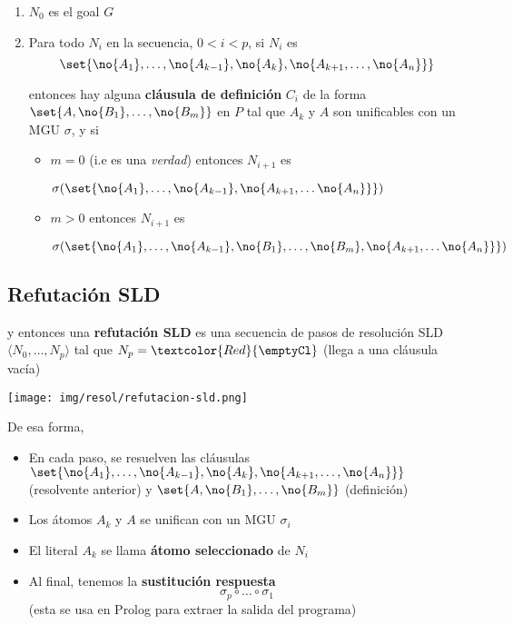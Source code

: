 \documentclass{report}
\theoremstyle{definition} %
\newcommand{\changed}[1]{\textcolor{Red}{#1}}
\begin{document}
\begin{enumerate}
    \item $N_0$ es el goal $G$
    \item Para todo $N_i$ en la secuencia, $0 < i < p$, si $N_i$ es
    \[
        \set{
            \no{A_1}, \dots, \no{A_{k-1}}, \no{A_k},
            \no{A_{k+1}, \dots, \no{A_n}}
        }
    \]

    entonces hay alguna \textbf{cláusula de definición} $C_i$ de la forma
    $\set{A, \no{B_1}, \dots, \no{B_m}}$ en $P$ tal que $A_k$ y $A$ son
    unificables con un MGU $\sigma$, y si
    \begin{itemize}
        \item $m = 0$ (i.e es una \textit{verdad}) entonces $N_{i+1}$ es
        
        \(
            \sigma(\set{
                \no{A_1}, \dots, \no{A_{k-1}},
                \no{A_{k+1}, \dots \no{A_n}}
            })
        \)
        \item $m > 0$ entonces $N_{i+1}$ es
        
        \(
            \sigma(\set{
                \no{A_1}, \dots, \no{A_{k-1}},
                \no{B_1}, \dots, \no{B_m},
                \no{A_{k+1}, \dots \no{A_n}}
            })
        \)
    \end{itemize}
\end{enumerate}

\subsection{Refutación SLD}

y entonces una \textbf{refutación SLD} es una secuencia de pasos de resolución
SLD $\langle N_0, \dots, N_p \rangle$ tal que $N_p = \changed{\emptyCl}$ (llega
a una cláusula vacía)

\begin{center}
    \texttt{[image: img/resol/refutacion-sld.png]}
\end{center}

De esa forma,

\begin{itemize}
    \item En cada paso, se resuelven las cláusulas \(
        \set{
            \no{A_1}, \dots, \no{A_{k-1}}, \no{A_k},
            \no{A_{k+1}, \dots, \no{A_n}}
        }
    \) (resolvente anterior) y $\set{A, \no{B_1}, \dots, \no{B_m}}$ (definición)

    \item Los átomos $A_k$ y $A$ se unifican con un MGU $\sigma_i$
    \item El literal $A_k$ se llama \textbf{átomo seleccionado} de $N_i$
    \item Al final, tenemos la \textbf{sustitución respuesta}
    \[
        \sigma_p \circ \dots \circ \sigma_1
    \]
    (esta se usa en Prolog para extraer la salida del programa)
\end{itemize}
\end{document}
